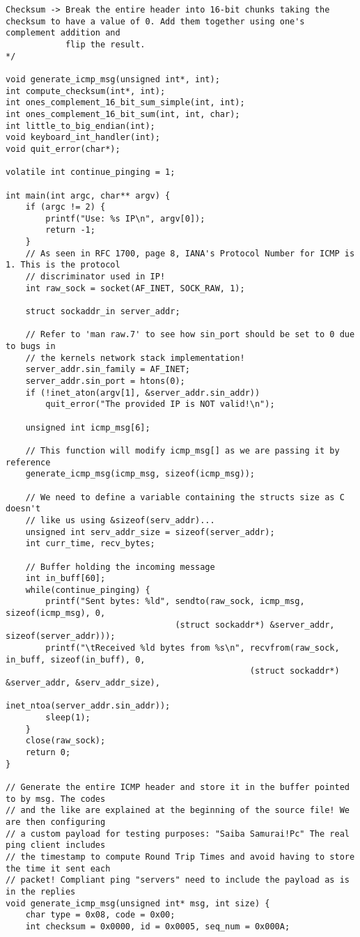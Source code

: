 \documentclass[landscape]{article}
\begin{document}
\begin{verbatim}
Checksum -> Break the entire header into 16-bit chunks taking the checksum to have a value of 0. Add them together using one's complement addition and
            flip the result.
*/

void generate_icmp_msg(unsigned int*, int);
int compute_checksum(int*, int);
int ones_complement_16_bit_sum_simple(int, int);
int ones_complement_16_bit_sum(int, int, char);
int little_to_big_endian(int);
void keyboard_int_handler(int);
void quit_error(char*);

volatile int continue_pinging = 1;

int main(int argc, char** argv) {
    if (argc != 2) {
        printf("Use: %s IP\n", argv[0]);
        return -1;
    }
    // As seen in RFC 1700, page 8, IANA's Protocol Number for ICMP is 1. This is the protocol
    // discriminator used in IP!
    int raw_sock = socket(AF_INET, SOCK_RAW, 1);

    struct sockaddr_in server_addr;

    // Refer to 'man raw.7' to see how sin_port should be set to 0 due to bugs in
    // the kernels network stack implementation!
    server_addr.sin_family = AF_INET;
    server_addr.sin_port = htons(0);
    if (!inet_aton(argv[1], &server_addr.sin_addr))
        quit_error("The provided IP is NOT valid!\n");

    unsigned int icmp_msg[6];

    // This function will modify icmp_msg[] as we are passing it by reference
    generate_icmp_msg(icmp_msg, sizeof(icmp_msg));

    // We need to define a variable containing the structs size as C doesn't
    // like us using &sizeof(serv_addr)...
    unsigned int serv_addr_size = sizeof(server_addr);
    int curr_time, recv_bytes;

    // Buffer holding the incoming message
    int in_buff[60];
    while(continue_pinging) {
        printf("Sent bytes: %ld", sendto(raw_sock, icmp_msg, sizeof(icmp_msg), 0,
                                  (struct sockaddr*) &server_addr, sizeof(server_addr)));
        printf("\tReceived %ld bytes from %s\n", recvfrom(raw_sock, in_buff, sizeof(in_buff), 0,
                                                 (struct sockaddr*) &server_addr, &serv_addr_size),
                                                 inet_ntoa(server_addr.sin_addr));
        sleep(1);
    }
    close(raw_sock);
    return 0;
}

// Generate the entire ICMP header and store it in the buffer pointed to by msg. The codes
// and the like are explained at the beginning of the source file! We are then configuring
// a custom payload for testing purposes: "Saiba Samurai!Pc" The real ping client includes
// the timestamp to compute Round Trip Times and avoid having to store the time it sent each
// packet! Compliant ping "servers" need to include the payload as is in the replies
void generate_icmp_msg(unsigned int* msg, int size) {
    char type = 0x08, code = 0x00;
    int checksum = 0x0000, id = 0x0005, seq_num = 0x000A;


\end{verbatim}
\end{document}
